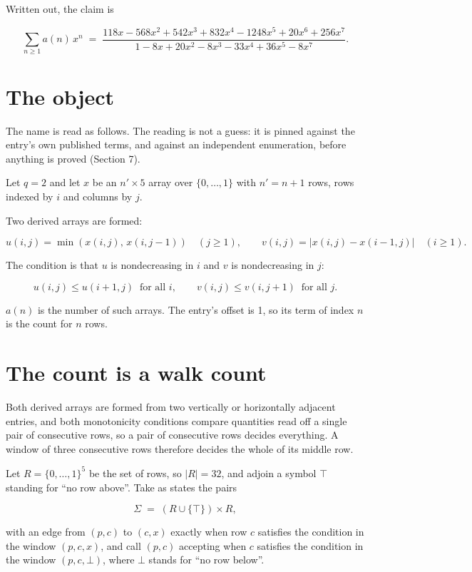 \documentclass[11pt]{article}
\theoremstyle{definition}
\begin{document}
Written out, the claim is

\[\sum_{n \ge 1} a(n)\,x^n \;=\; \frac{118x - 568x^{2} + 542x^{3} + 832x^{4} - 1248x^{5} + 20x^{6} + 256x^{7}}{1 - 8x + 20x^{2} - 8x^{3} - 33x^{4} + 36x^{5} - 8x^{7}}.\]

\section{The object}

The name is read as follows. The reading is not a guess: it is pinned against the entry's own published terms, and against an independent enumeration, before anything is proved (Section 7).

Let $q = 2$ and let $x$ be an $n' \times 5$ array over $\{0,\dots,1\}$ with $n' = n + 1$ rows, rows indexed by $i$ and columns by $j$.

Two derived arrays are formed:

\[u(i,j) = \min(x(i,j),\,x(i,j{-}1))\quad (j \ge 1), \qquad v(i,j) = \lvert x(i,j) - x(i{-}1,j)\rvert\quad (i \ge 1).\]

The condition is that $u$ is nondecreasing in $i$ and $v$ is nondecreasing in $j$:

\[u(i,j) \le u(i{+}1,j) \ \text{ for all } i, \qquad v(i,j) \le v(i,j{+}1) \ \text{ for all } j.\]

$a(n)$ is the number of such arrays. The entry's offset is 1, so its term of index $n$ is the count for $n$ rows.

\section{The count is a walk count}

Both derived arrays are formed from two vertically or horizontally adjacent entries, and both monotonicity conditions compare quantities read off a single pair of consecutive rows, so a pair of consecutive rows decides everything. A window of three consecutive rows therefore decides the whole of its middle row.

Let $R = \{0,\dots,1\}^{5}$ be the set of rows, so $|R| = 32$, and adjoin a symbol $\top$ standing for ``no row above''. Take as states the pairs

\[\Sigma \;=\; (R \cup \{\top\}) \times R,\]

with an edge from $(p,c)$ to $(c,x)$ exactly when row $c$ satisfies the condition in the window $(p,c,x)$, and call $(p,c)$ accepting when $c$ satisfies the condition in the window $(p,c,\bot)$, where $\bot$ stands for ``no row below''.
\end{document}
